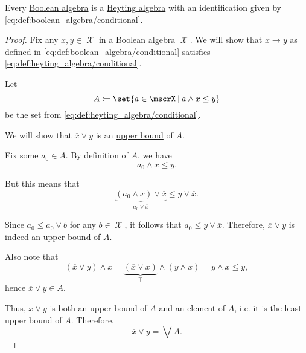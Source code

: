 \begin{proposition}\label{thm:boolean_algebras_are_heyting_algebras}
  Every \hyperref[def:boolean_algebra]{Boolean algebra} is a \hyperref[def:heyting_algebra]{Heyting algebra} with an identification given by \eqref{eq:def:boolean_algebra/conditional}.
\end{proposition}
\begin{proof}
  Fix any \( x, y \in \mscrX \) in a Boolean algebra \( \mscrX \). We will show that \( x \rightarrow y \) as defined in \eqref{eq:def:boolean_algebra/conditional} satisfies \eqref{eq:def:heyting_algebra/conditional}.

  Let
  \begin{equation*}
   A \coloneqq \set{ a \in \mscrX \given a \wedge x \leq y }
  \end{equation*}
  be the set from \eqref{eq:def:heyting_algebra/conditional}.

  We will show that \( \overline x \vee y \) is an \hyperref[def:partially_ordered_set_extremal_points/upper_and_lower_bounds]{upper bound} of \( A \).

  Fix some \( a_0 \in A \). By definition of \( A \), we have
  \begin{equation*}
   a_0 \wedge x \leq y.
  \end{equation*}

  But this means that
  \begin{equation*}
   \underbrace{(a_0 \wedge x) \vee \overline x}_{a_0 \vee \overline x} \leq y \vee \overline x.
  \end{equation*}

  Since \( a_0 \leq a_0 \vee b \) for any \( b \in \mscrX \), it follows that \( a_0 \leq y \vee \overline x \). Therefore, \( \overline x \vee y \) is indeed an upper bound of \( A \).

  Also note that
  \begin{equation*}
   (\overline x \vee y) \wedge x = \underbrace{(\overline x \vee x)}_{\top} \wedge (y \wedge x) = y \wedge x \leq y,
  \end{equation*}
  hence \( \overline x \vee y \in A \).

  Thus, \( \overline x \vee y \) is both an upper bound of \( A \) and an element of \( A \), i.e. it is the least upper bound of \( A \). Therefore,
  \begin{equation*}
   \overline x \vee y = \bigvee A.
  \end{equation*}
\end{proof}

